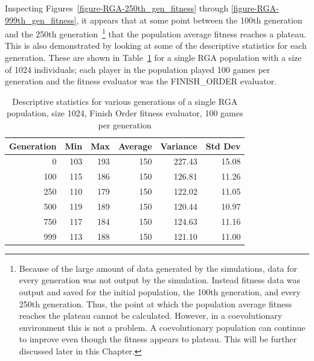 Inspecting Figures~\ref{figure-RGA-250th_gen_fitness} through
\ref{figure-RGA-999th_gen_fitness}, it appears that at some point between the
100th generation and the 250th generation~\footnote{Because of the large amount
of data generated by the simulations, data for every generation was not output
by the simulation. Instead fitness data was output and saved for the initial
population, the 100th generation, and every 250th generation. Thus, the point at
which the population average fitness reaches the plateau cannot be calculated.
However, in a coevolutionary environment this is not a problem. A coevolutionary
population can continue to improve even though the fitness appears to plateau.
This will be further discussed later in this Chapter.} that the population
average fitness reaches a plateau. This is also demonstrated by looking at some
of the descriptive statistics for each generation. These are shown in
Table~\ref{table-stats-for-s1024-n100-fo} for a single RGA population with a
size of 1024 individuals; each player in the population played 100 games per
generation and the fitness evaluator was the FINISH\_ORDER evaluator.

\begin{table}[ht]
\begin{center}
\begin{tabular}{ | r || r | r | r | r | r |}
\hline                        
Generation & Min & Max & Average & Variance & Std Dev \\ \hline \hline
0   & 103 & 193 & 150 & 227.43 & 15.08 \\ \hline
100 & 115 & 186 & 150 & 126.81 & 11.26 \\ \hline 
250 & 110 & 179 & 150 & 122.02 & 11.05 \\ \hline
500 & 119 & 189 & 150 & 120.44 & 10.97 \\ \hline
750 & 117 & 184 & 150 & 124.63 & 11.16 \\ \hline
999 & 113 & 188 & 150 & 121.10 & 11.00 \\ \hline
\end{tabular}
\caption{Descriptive statistics for various generations of a single RGA
population, size 1024, Finish Order fitness evaluator, 100 games per generation}
\label{table-stats-for-s1024-n100-fo}
\end{center}
\end{table}

